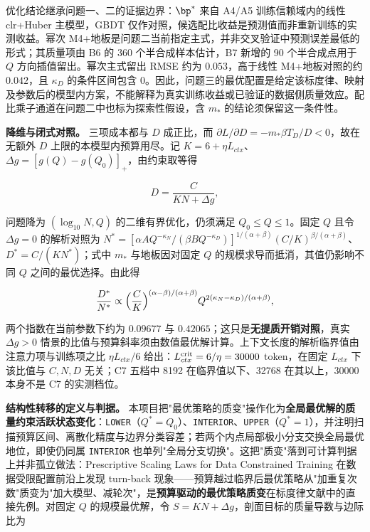 优化结论继承问题一、二的证据边界：$\bp^*$ 来自 A4/A5 训练信赖域内的线性 clr+Huber 主模型，GBDT 仅作对照，候选配比收益是预测值而非重新训练的实测收益。幂次 M4+地板是问题二当前指定主式，并非交叉验证中预测误差最低的形式；其质量项由 B6 的 360 个半合成样本估计，B7 新增的 90 个半合成点用于 $Q$ 方向插值留出。幂次主式留出 RMSE 约为 $0.053$，高于线性 M4+地板对照的约 $0.042$，且 $\kappa_D$ 的条件区间包含 $0$。因此，问题三的最优配置是给定该标度律、映射及参数后的模型内方案，不能解释为真实训练收益或已验证的数据侧质量效应。配比乘子通道在问题二中也标为探索性假设，含 $m_*$ 的结论须保留这一条件性。

\textbf{降维与闭式对照。} 三项成本都与 $D$ 成正比，而 $\partial L/\partial D=-m_*\beta T_D/D<0$，故在无额外 $D$ 上限的本模型内预算用尽。记 $K=6+\eta L_{ctx}$、$\Delta g=[g(Q)-g(Q_0)]_+$，由约束取等得

\begin{equation*}
D=\frac{C}{KN+\Delta g},
\end{equation*}

问题降为 $(\log_{10}N,Q)$ 的二维有界优化，仍须满足 $Q_0\le Q\le1$。固定 $Q$ 且令 $\Delta g=0$ 的解析对照为 $N^*=[\alpha AQ^{-\kappa_N}/(\beta BQ^{-\kappa_D})]^{1/(\alpha+\beta)}(C/K)^{\beta/(\alpha+\beta)}$、$D^*=C/(KN^*)$；式中 $m_*$ 与地板因对固定 $Q$ 的规模求导而抵消，其值仍影响不同 $Q$ 之间的最优选择。由此得

\begin{equation*}
\frac{D^*}{N^*}\propto\Bigl(\frac CK\Bigr)^{(\alpha-\beta)/(\alpha+\beta)}Q^{2(\kappa_N-\kappa_D)/(\alpha+\beta)},
\end{equation*}

两个指数在当前参数下约为 $0.09677$ 与 $0.42065$；这只是\textbf{无提质开销对照}，真实 $\Delta g>0$ 情景的比值与预算斜率须由数值最优解计算。上下文长度的解析临界值由注意力项与训练项之比 $\eta L_{ctx}/6$ 给出：$L_{ctx}^{\rm crit}=6/\eta=30000$ token，在固定 $L_{ctx}$ 下该比值与 $C,N,D$ 无关；C7 五档中 8192 在临界值以下、32768 在其以上，30000 本身不是 C7 的实测档位。

\textbf{结构性转移的定义与判据。} 本项目把"最优策略的质变"操作化为\textbf{全局最优解的质量约束活跃状态变化}：\texttt{LOWER}（$Q^*=Q_0$）、\texttt{INTERIOR}、\texttt{UPPER}（$Q^*=1$），并注明扫描预算区间、离散化精度与边界分类容差；若两个内点局部极小分支交换全局最优地位，即使仍同属 \texttt{INTERIOR} 也单列"全局分支切换"。这把"质变"落到可计算判据上并非孤立做法：Prescriptive Scaling Laws for Data Constrained Training\cite{lovelace} 在数据受限配置前沿上发现 turn-back 现象——预算越过临界后最优策略从"加重复次数"质变为"加大模型、减轮次"，是\textbf{预算驱动的最优策略质变}在标度律文献中的直接先例。对固定 $Q$ 的规模最优解，令 $S=KN+\Delta g$，剖面目标的质量导数与边际比为

